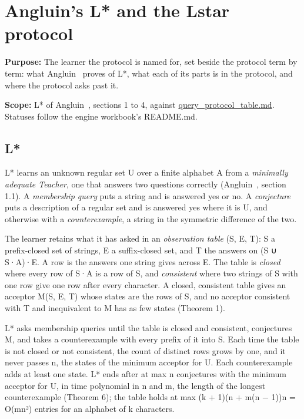 \chapter{\texorpdfstring{Angluin's L* and the Lstar protocol}{Angluin's L and the Lstar protocol}}
\label{chap:angluin}

\textbf{Purpose:} The learner the protocol is named for, set beside the protocol term by term: what Angluin~\cite{src:Angluin-1987} proves of L*, what each of its parts is in the protocol, and where the protocol asks past it.

\textbf{Scope:} L* of Angluin~\cite{src:Angluin-1987}, sections 1 to 4, against \hyperref[chap:query-protocol-table]{query\_\allowbreak{}protocol\_\allowbreak{}table.md}. Statuses follow the engine workbook's README.md.

\section{\texorpdfstring{L*}{L}}

L* learns an unknown regular set U over a finite alphabet A from a \emph{minimally adequate Teacher}, one that answers two questions correctly (Angluin~\cite{src:Angluin-1987}, section 1.1). A \emph{membership query} puts a string and is answered yes or no. A \emph{conjecture} puts a description of a regular set and is answered yes where it is U, and otherwise with a \emph{counterexample}, a string in the symmetric difference of the two.

The learner retains what it has asked in an \emph{observation table} (S, E, T): S a prefix-closed set of strings, E a suffix-closed set, and T the answers on (S ∪ S·A)·E. A row is the answers one string gives across E. The table is \emph{closed} where every row of S·A is a row of S, and \emph{consistent} where two strings of S with one row give one row after every character. A closed, consistent table gives an acceptor M(S, E, T) whose states are the rows of S, and no acceptor consistent with T and inequivalent to M has as few states (Theorem 1).

L* asks membership queries until the table is closed and consistent, conjectures M, and takes a counterexample with every prefix of it into S. Each time the table is not closed or not consistent, the count of distinct rows grows by one, and it never passes n, the states of the minimum acceptor for U. Each counterexample adds at least one state. L* ends after at max n conjectures with the minimum acceptor for U, in time polynomial in n and m, the length of the longest counterexample (Theorem 6); the table holds at max (k + 1)(n + m(n − 1))n = O(mn²) entries for an alphabet of k characters.

